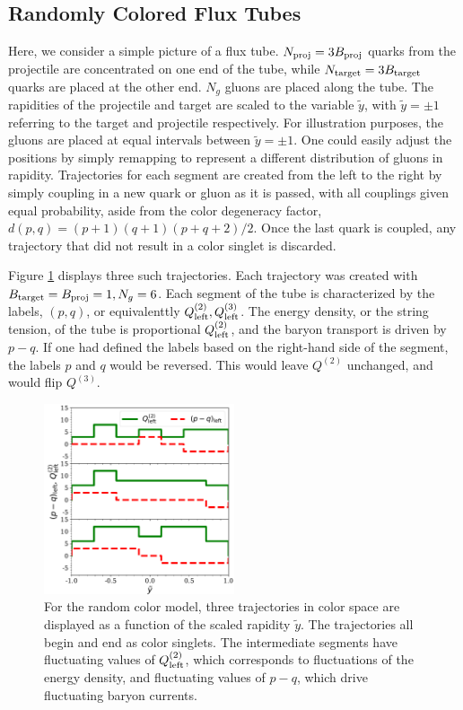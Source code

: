 \documentclass[aps, prc, 12pt, nofootinbib, showpacs, superscriptaddress, tightenlines, groupedaddress]{revtex4-2}
\begin{document}
\subsection{Randomly Colored Flux Tubes}

Here, we consider a simple picture of a flux tube. $N_{\rm proj}=3B_{\rm proj}$ quarks from the projectile are concentrated on one end of the tube, while $N_{\rm target}=3B_{\rm target}$ quarks are placed at the other end. $N_g$ gluons are placed along the tube. The rapidities of the projectile and target are scaled to the variable $\tilde{y}$, with $\tilde{y}=\pm 1$ referring to the target and projectile respectively. For illustration purposes, the gluons are placed at equal intervals between $\tilde{y}=\pm 1$. One could easily adjust the positions by simply remapping to represent a different distribution of gluons in rapidity. Trajectories for each segment are created from the left to the right by simply coupling in a new quark or gluon as it is passed, with all couplings given equal probability, aside from the color degeneracy factor, $d(p,q)=(p+1)(q+1)(p+q+2)/2$. Once the last quark is coupled, any trajectory that did not result in a color singlet is discarded. 

Figure \ref{fig:sampletrajectories} displays three such trajectories. Each trajectory was created with $B_{\rm target}=B_{\rm proj}=1, N_g=6$. Each segment of the tube is characterized by the labels, $(p,q)$, or equivalenttly $Q^{(2)}_{\rm left},Q^{(3)}_{\rm left}$. The energy density, or the string tension, of the tube is proportional $Q^{(2)}_{\rm left}$, and the baryon transport is driven by $p-q$. If one had defined the labels based on the right-hand side of the segment, the labels $p$ and $q$ would be reversed. This would leave $Q^{(2)}$ unchanged, and would flip $Q^{(3)}$. 
\begin{figure}
\centerline{\includegraphics[width=0.5\textwidth]{figs/sample_trajectories.pdf}}
\caption{\label{fig:sampletrajectories}
For the random color model, three trajectories in color space are displayed as a function of the scaled rapidity $\tilde{y}$. The trajectories all begin and end as color singlets. The intermediate segments have fluctuating values of $Q^{(2)}_{\rm left}$, which corresponds to fluctuations of the energy density, and fluctuating values of $p-q$, which drive fluctuating baryon currents.
}
\end{figure}
\end{document}
